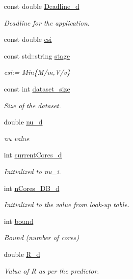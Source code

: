 \begin{DoxyCompactItemize}
const double \hyperlink{classApplication_ae90c165056428718e7341999781a3963}{Deadline\-\_\-d}
\begin{DoxyCompactList}\small\item\em Deadline for the application. \end{DoxyCompactList}\item 
const double \hyperlink{classApplication_a7c4d5b6d8d7b2c480008dbd958872ed2}{csi}
\item 
const std\-::string \hyperlink{classApplication_a27731ed4d16f6e9583b52c4f09a69258}{stage}
\begin{DoxyCompactList}\small\item\em csi\-:= Min\{M/m,V/v\} \end{DoxyCompactList}\item 
const int \hyperlink{classApplication_a83bcec93383a2816d9bbaa51b7dfa0c6}{dataset\-\_\-size}
\begin{DoxyCompactList}\small\item\em Size of the dataset. \end{DoxyCompactList}\item 
double \hyperlink{classApplication_a42c22b9a3130cf1f2722ce222f2e5bae}{nu\-\_\-d}
\begin{DoxyCompactList}\small\item\em nu value \end{DoxyCompactList}\item 
int \hyperlink{classApplication_adee341a84a5389dfd4d16e7f8e697190}{current\-Cores\-\_\-d}
\begin{DoxyCompactList}\small\item\em Initialized to nu\-\_\-i. \end{DoxyCompactList}\item 
int \hyperlink{classApplication_a95104d330c9c7ed2c1017b4938a39a9a}{n\-Cores\-\_\-\-D\-B\-\_\-d}
\begin{DoxyCompactList}\small\item\em Initialized to the value from look-\/up table. \end{DoxyCompactList}\item 
int \hyperlink{classApplication_a6e91bef9d503af0e8ba38c8f445c8cb0}{bound}
\begin{DoxyCompactList}\small\item\em Bound (number of cores) \end{DoxyCompactList}\item 
double \hyperlink{classApplication_a374d43f68ae27aaed98278e8152a434c}{R\-\_\-d}
\begin{DoxyCompactList}\small\item\em Value of R as per the predictor. \end{DoxyCompactList}\item 

\end{DoxyCompactItemize}
